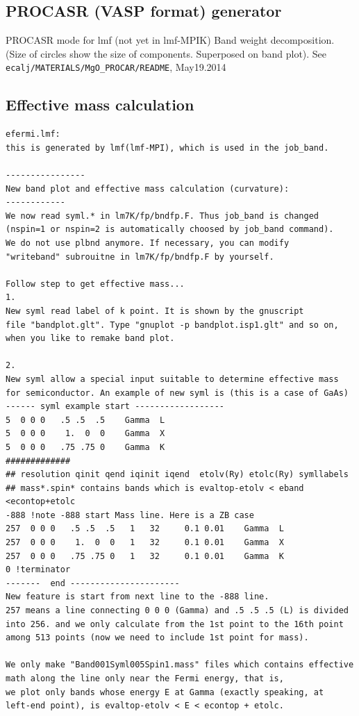 \subsection{PROCASR (VASP format) generator}
PROCASR mode for lmf (not yet in lmf-MPIK)
Band weight decomposition. 
(Size of circles show the size of components. Superposed on band
plot). See \verb#ecalj/MATERIALS/MgO_PROCAR/README#, May19.2014


\subsection{Effective mass calculation}
\begin{verbatim}
efermi.lmf:
this is generated by lmf(lmf-MPI), which is used in the job_band.

----------------
New band plot and effective mass calculation (curvature):
------------
We now read syml.* in lm7K/fp/bndfp.F. Thus job_band is changed
(nspin=1 or nspin=2 is automatically choosed by job_band command).
We do not use plbnd anymore. If necessary, you can modify
"writeband" subrouitne in lm7K/fp/bndfp.F by yourself.

Follow step to get effective mass...
1. 
New syml read label of k point. It is shown by the gnuscript
file "bandplot.glt". Type "gnuplot -p bandplot.isp1.glt" and so on,
when you like to remake band plot.

2. 
New syml allow a special input suitable to determine effective mass
for semiconductor. An example of new syml is (this is a case of GaAs)
------ syml example start ------------------
5  0 0 0   .5 .5  .5    Gamma  L
5  0 0 0    1.  0  0    Gamma  X
5  0 0 0   .75 .75 0    Gamma  K
#############
## resolution qinit qend iqinit iqend  etolv(Ry) etolc(Ry) symllabels
## mass*.spin* contains bands which is evaltop-etolv < eband <econtop+etolc
-888 !note -888 start Mass line. Here is a ZB case
257  0 0 0   .5 .5  .5   1   32     0.1 0.01    Gamma  L
257  0 0 0    1.  0  0   1   32     0.1 0.01    Gamma  X
257  0 0 0   .75 .75 0   1   32     0.1 0.01    Gamma  K
0 !terminator  
-------  end ----------------------
New feature is start from next line to the -888 line.
257 means a line connecting 0 0 0 (Gamma) and .5 .5 .5 (L) is divided
into 256. and we only calculate from the 1st point to the 16th point
among 513 points (now we need to include 1st point for mass).

We only make "Band001Syml005Spin1.mass" files which contains effective
math along the line only near the Fermi energy, that is,
we plot only bands whose energy E at Gamma (exactly speaking, at
left-end point), is evaltop-etolv < E < econtop + etolc.


\end{verbatim}
